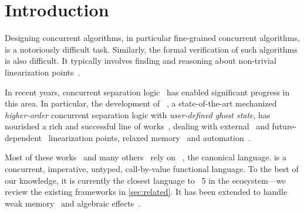 \section{Introduction}
\label{sec:introduction}

Designing concurrent algorithms, in particular fine-grained concurrent algorithms, is a notoriously difficult task.
Similarly, the formal verification of such algorithms is also difficult.
It typically involves finding and reasoning about non-trivial linearization points~\cite{DBLP:journals/csur/DongolD15,DBLP:journals/pacmpl/JungLPRTDJ20,DBLP:conf/cpp/VindumB21,DBLP:conf/cpp/VindumFB22,DBLP:conf/osdi/Chang0STKZ23}.

In recent years, concurrent separation logic~\cite{DBLP:journals/siglog/BrookesO16} has enabled significant progress in this area.
In particular, the development of \Iris~\cite{DBLP:journals/jfp/JungKJBBD18}, a state-of-the-art mechanized \emph{higher-order} concurrent separation logic with \emph{user-defined ghost state}, has nourished a rich and successful line of works~\cite{DBLP:journals/pacmpl/JungLPRTDJ20,DBLP:conf/cpp/VindumB21,DBLP:conf/cpp/VindumFB22,DBLP:conf/osdi/Chang0STKZ23,DBLP:conf/cpp/CarbonneauxZKON22,DBLP:journals/pacmpl/JungLCKPK23,DBLP:journals/pacmpl/SomersK24,DBLP:journals/pacmpl/MevelJP20,DBLP:journals/pacmpl/MevelJ21,DBLP:conf/pldi/DangJCNMKD22,DBLP:journals/pacmpl/ParkKMJLKK24,DBLP:conf/pldi/MulderKG22,DBLP:journals/pacmpl/MulderK23}, dealing with external~\cite{DBLP:conf/cpp/VindumFB22} and future-dependent~\cite{DBLP:journals/pacmpl/JungLPRTDJ20,DBLP:conf/cpp/VindumB21,DBLP:conf/osdi/Chang0STKZ23} linearization points, relaxed memory~\cite{DBLP:journals/pacmpl/MevelJP20,DBLP:journals/pacmpl/MevelJ21,DBLP:conf/pldi/DangJCNMKD22,DBLP:journals/pacmpl/ParkKMJLKK24} and automation~\cite{DBLP:conf/pldi/MulderKG22,DBLP:journals/pacmpl/MulderK23}.

Most of these works~\cite{DBLP:journals/pacmpl/JungLPRTDJ20,DBLP:conf/cpp/VindumB21,DBLP:conf/cpp/VindumFB22,DBLP:conf/cpp/CarbonneauxZKON22,DBLP:journals/pacmpl/JungLCKPK23,DBLP:journals/pacmpl/SomersK24,DBLP:conf/pldi/MulderKG22,DBLP:journals/pacmpl/MulderK23} and many others~\cite{DBLP:journals/pacmpl/VilhenaPJ20,DBLP:journals/pacmpl/PottierGJM24,DBLP:journals/pacmpl/TimanyGB24,DBLP:journals/pacmpl/LorenzenLSL24} rely on \HeapLang~\cite{heaplang}, the canonical \Iris language.
\HeapLang is a concurrent, imperative, untyped, call-by-value functional language.
To the best of our knowledge, it is currently the closest language to \OCaml~5 in the \Iris ecosystem---we review the existing frameworks in \cref{sec:related}.
It has been extended to handle weak memory~\cite{DBLP:journals/pacmpl/MevelJP20} and algebraic effects~\cite{DBLP:journals/pacmpl/VilhenaP21}.

